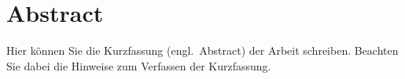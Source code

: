 \chapter*{Abstract}

Hier können Sie die Kurzfassung (engl.~Abstract) der Arbeit schreiben. Beachten Sie dabei die Hinweise zum Verfassen der Kurzfassung.


